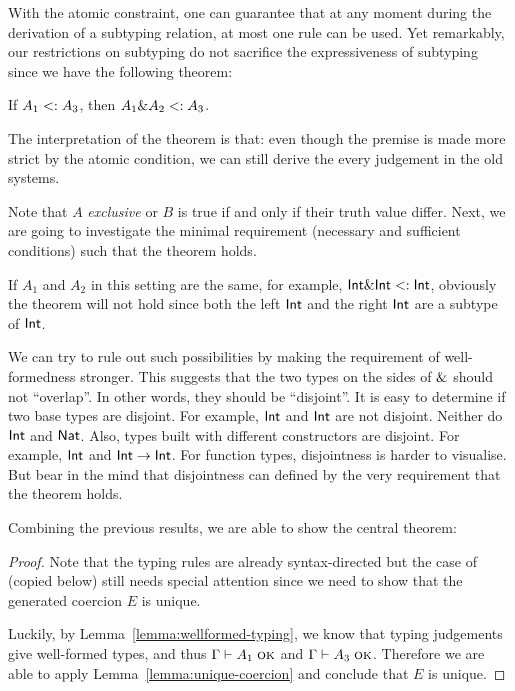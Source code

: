 With the atomic constraint, one can guarantee that at any moment during the
derivation of a subtyping relation, at most one rule can be used. Yet
remarkably, our restrictions on subtyping do not sacrifice the expressiveness of
subtyping since we have the following theorem:
\begin{theorem}
  If $A_1 \subtype A_3$, then $A_1 \inter A_2 \subtype A_3$.
\end{theorem}
The interpretation of the theorem is that: even though the premise is made more
strict by the atomic condition, we can still derive the every judgement in the
old systems. 

Note that $A$ \emph{exclusive} or $B$ is true if and only if their truth value
differ. Next, we are going to investigate the minimal requirement (necessary and
sufficient conditions) such that the theorem holds.

If $A_1$ and $A_2$ in this setting are the same, for example,
$\tyint \inter \tyint \subtype \tyint$, obviously the theorem will
not hold since both the left $\tyint$ and the right $\tyint$ are a
subtype of $\tyint$.

We can try to rule out such possibilities by making the requirement of
well-formedness stronger. This suggests that the two types on the sides of
$\inter$ should not ``overlap''. In other words, they should be ``disjoint''. It
is easy to determine if two base types are disjoint. For example, $\tyint$
and $\tyint$ are not disjoint. Neither do $\tyint$ and $\code{Nat}$.
Also, types built with different constructors are disjoint. For example,
$\tyint$ and $\tyint \to \tyint$. For function types, disjointness
is harder to visualise. But bear in the mind that disjointness can defined by
the very requirement that the theorem holds.

Combining the previous results, we are able to show the central theorem:
\uniqueelaboration*

\begin{proof}
  Note that the typing rules are already syntax-directed but the case of
   (copied below) still needs special attention since we
  need to show that the generated coercion $E$ is unique.
  \begin{mathpar}
  \end{mathpar}
  Luckily, by Lemma~\ref{lemma:wellformed-typing}, we know that typing
  judgements give well-formed types, and thus $\jwf \Gamma {A_1}$ and $\jwf
  \Gamma {A_3}$. Therefore we are able to apply
  Lemma~\ref{lemma:unique-coercion} and conclude that $E$ is unique.

\end{proof}
